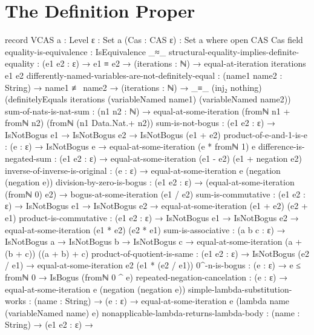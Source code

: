\documentclass{report}
\begin{document}
\section{The Definition Proper}

\begin{code}
record VCAS {a : Level} {ε : Set a} (Cas : CAS ε) : Set a where
  open CAS Cas
  field
    equality-is-equivalence : IsEquivalence _≈_
    structural-equality-implies-definite-equality :
      (e1 e2 : ε) →
      e1 ≡ e2 →
      (iterations : ℕ) →
      equal-at-iteration iterations e1 e2
    differently-named-variables-are-not-definitely-equal :
      (name1 name2 : String) →
      name1 ≢ name2 →
      (iterations : ℕ) →
      _≡_ (inj₂ nothing)
          (definitelyEquals iterations
                            (variableNamed name1)
                            (variableNamed name2))
    sum-of-nats-is-nat-sum :
      (n1 n2 : ℕ) →
      equal-at-some-iteration (fromℕ n1 + fromℕ n2) (fromℕ (n1 Data.Nat.+ n2))
    sum-is-not-bogus :
      (e1 e2 : ε) →
      IsNotBogus e1 →
      IsNotBogus e2 →
      IsNotBogus (e1 + e2)
    product-of-e-and-1-is-e :
      (e : ε) →
      IsNotBogus e →
      equal-at-some-iteration (e * fromℕ 1) e
    difference-is-negated-sum :
      (e1 e2 : ε) →
      equal-at-some-iteration (e1 - e2)
                              (e1 + negation e2)
    inverse-of-inverse-is-original :
      (e : ε) →
      equal-at-some-iteration e (negation (negation e))
    division-by-zero-is-bogus :
      (e1 e2 : ε) →
      (equal-at-some-iteration (fromℕ 0) e2) →
      bogus-at-some-iteration (e1 / e2)
    sum-is-commutative :
      (e1 e2 : ε) →
      IsNotBogus e1 →
      IsNotBogus e2 →
      equal-at-some-iteration (e1 + e2) (e2 + e1)
    product-is-commutative :
      (e1 e2 : ε) →
      IsNotBogus e1 →
      IsNotBogus e2 →
      equal-at-some-iteration (e1 * e2) (e2 * e1)
    sum-is-associative :
      (a b c : ε) →
      IsNotBogus a →
      IsNotBogus b →
      IsNotBogus c →
      equal-at-some-iteration (a + (b + c)) ((a + b) + c)
    product-of-quotient-is-same :
      (e1 e2 : ε) →
      IsNotBogus (e2 / e1) →
      equal-at-some-iteration e2 (e1 * (e2 / e1))
    0^-n-is-bogus : (e : ε) → e ≤ fromℕ 0 → IsBogus (fromℕ 0 ^ e)
    repeated-negation-cancelation :
      (e : ε) → equal-at-some-iteration e (negation (negation e))
    simple-lambda-substitution-works :
      (name : String) →
      (e : ε) →
      equal-at-some-iteration e (lambda name (variableNamed name) e)
    nonapplicable-lambda-returns-lambda-body :
      (name : String) →
      (e1 e2 : ε) →

\end{code}
\end{document}

